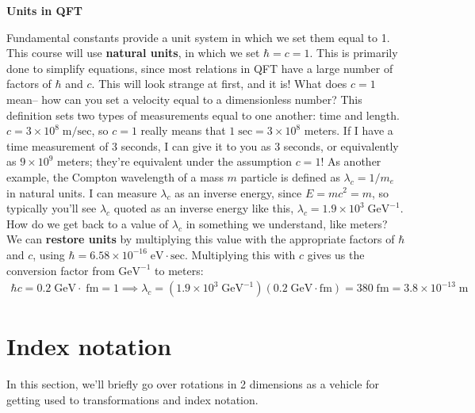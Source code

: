 \documentclass[12pt, oneside]{article}   	%
\theoremstyle{definition}
\begin{document}
\vspace{10mm}
\begin{answerbox}
	{\centering \textbf{Units in QFT} } \\
	
	\raggedright
	Fundamental constants provide a unit system in which we set them equal to 1. This course will use \textbf{natural units}, in which we set $\hbar = c = 1$. This is primarily done to simplify equations, since most relations in QFT have a large number of factors of $\hbar$ and $c$. This will look strange at first, and it is! What does $c = 1$ mean-- how can you set a velocity equal to a dimensionless number? This definition sets two types of measurements equal to one another: time and length. $c = 3\times 10^8\;\mathrm{m} / \mathrm{sec}$, so $c = 1$ really means that $1\;\mathrm{sec} = 3\times 10^8$ meters. If I have a time measurement of 3 seconds, I can give it to you as 3 seconds, or equivalently as $9\times 10^9$ meters; they're equivalent under the assumption $c = 1$! 
	\newline\newline
	As another example, the Compton wavelength of a mass $m$ particle is defined as $\lambda_c = 1 / m_e$ in natural units. I can measure $\lambda_c$ as an inverse energy, since $E = mc^2 = m$, so typically you'll see $\lambda_c$ quoted as an inverse energy like this, $\lambda_c = 1.9\times 10^3\;\mathrm{GeV}^{-1}$. How do we get back to a value of $\lambda_c$ in something we understand, like meters? We can \textbf{restore units} by multiplying this value with the appropriate factors of $\hbar$ and $c$, using $\hbar = 6.58\times 10^{-16}\;\mathrm{eV}\cdot \mathrm{sec}$. Multiplying this with $c$ gives us the conversion factor from $\mathrm{GeV}^{-1}$ to meters:
	\begin{align}
		\hbar c = 0.2\;\mathrm{GeV}\cdot\;\mathrm{fm} = 1 \implies \lambda_c = (1.9\times 10^3\;\mathrm{GeV}^{-1}) (0.2\;\mathrm{GeV}\cdot \mathrm{fm}) = 380\;\mathrm{fm} = 3.8\times 10^{-13}\;\mathrm{m}
	\end{align}
\end{answerbox}

\newpage
\section*{Index notation}


In this section, we'll briefly go over rotations in 2 dimensions as a vehicle for getting used to transformations and index notation. 
\end{document}

